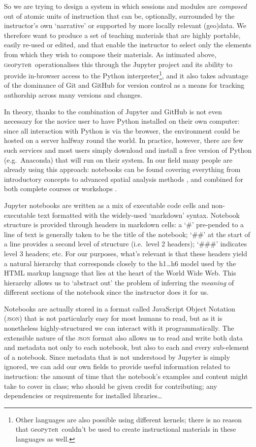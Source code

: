 \documentclass[letter, 11pt]{article}
\newcommand{\gp}{\textsc{g}eo\textsc{p}y\textsc{t}e\textsc{r}~\/}
\newcommand{\eg}{e.g.~\/}
\newcommand{\ie}{i.e.~\/}
\begin{document}
So we are trying to design a system in which sessions and modules are
\emph{composed} out of atomic units of instruction that can be, optionally,
surrounded by the instructor's own `narrative' or supported by more locally
relevant (geo)data. We therefore want to produce a set of teaching materials
that are highly portable, easily re-used or edited, and that enable the
instructor to select only the elements from which they wish to compose their
materials. As intimated above, \gp operationalises this through the Jupyter
project and its ability to provide in-browser access to the Python
interpreter\footnote{Other languages are also possible using different kernels;
there is no reason that \gp couldn't be used to create instructional materials
in these languages as well.}, and it also takes advantage of the dominance of
Git and GitHub for version control as a means for tracking authorship across
many versions and changes.

In theory, thanks to the combination of Jupyter and GitHub is not even necessary
for the novice user to have Python installed on their own computer: since all
interaction with Python is via the browser, the environment could be hosted on a
server halfway round the world. In practice, however, there are few such
services and most users simply download and install a free version of Python
(\eg Anaconda) that will run on their system. In our field many people are
already using this approach: notebooks can be found covering everything from
introductory concepts \citep{millington_reades_2017_code} to advanced spatial
analysis methods \citep{darribas_gds15}, and combined for both complete courses
or workshops \citep{rey_2016_narsc}.

Jupyter notebooks are written as a mix of executable code cells and
non-executable text formatted with the widely-used `markdown' syntax. Notebook
structure is provided through headers in markdown cells: a `\#' pre-pended to a
line of text is generally taken to be the title of the notebook; `\#\#' at the
start of a line provides a second level of structure (\ie level 2 headers);
`\#\#\#' indicates level 3 headers; etc. For our purposes, what's relevant is
that these headers yield a natural hierarchy that corresponds closely to the
h1\ldots{}h6 model used by the HTML markup language that lies at the heart of
the World Wide Web. This hierarchy allows us to `abstract out' the problem of
inferring the \emph{meaning} of different sections of the notebook since the
instructor does it for us.

Notebooks are actually stored in a format called JavaScript Object Notation
(\textsc{json}) that is not particularly easy for most humans to read, but as it
is nonetheless highly-structured we can interact with it programmatically. The
extensible nature of the \textsc{json} format also allows us to read and write
both data and metadata not only to each notebook, but also to each and every
sub-element of a notebook. Since metadata that is not understood by Jupyter is
simply ignored, we can add our own fields to provide useful information related
to instruction: the amount of time that the notebook's examples and content
might take to cover in class; who should be given credit for contributing; any
dependencies or requirements for installed libraries\ldots
\end{document}
